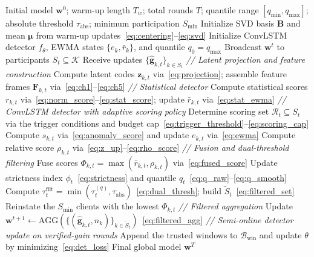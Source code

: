 \documentclass[journal]{IEEEtran}
\begin{document}
\begin{algorithm}[t]
\caption{USTAD-FL: Unsupervised Statistical Anomaly Detection at the server}
\label{alg:ustad}
\begin{algorithmic}[1]
\REQUIRE Initial model $\mathbf{w}^{0}$; warm-up length $T_w$; total rounds $T$; quantile range $[q_{\min},q_{\max}]$; absolute threshold $\tau_{\mathrm{abs}}$; minimum participation $S_{\min}$
\STATE Initialize SVD basis $\mathbf{B}$ and mean $\boldsymbol{\mu}$ from warm-up updates~\eqref{eq:centering}--\eqref{eq:svd}
\STATE Initialize ConvLSTM detector $f_\theta$, EWMA states $\{e_{k},\bar r_{k}\}$, and quantile $q_{0}\!=\!q_{\max}$
    \STATE Broadcast $\mathbf{w}^{t}$ to participants $S_t \subseteq \mathcal{K}$
    \STATE Receive updates $\{\hat{\mathbf{g}}_{k,t}\}_{k\in S_t}$
    \STATE \textit{// Latent projection and feature construction}
    \STATE Compute latent codes $\mathbf{z}_{k,t}$ via~\eqref{eq:projection}; assemble feature frames $\mathbf{F}_{k,t}$ via~\eqref{eq:ch1}--\eqref{eq:ch5}
    \STATE \textit{// Statistical detector}
    \STATE Compute statistical scores $r_{k,t}$ via~\eqref{eq:norm_score}--\eqref{eq:stat_score}; update $\bar r_{k,t}$ via~\eqref{eq:stat_ewma}
    \STATE \textit{// ConvLSTM detector with adaptive scoring policy}
    \STATE Determine scoring set $\mathcal{R}_t \subseteq S_t$ via the trigger conditions and budget cap~\eqref{eq:trigger_threshold}--\eqref{eq:scoring_cap}
        \STATE Compute $s_{k,t}$ via~\eqref{eq:anomaly_score} and update $e_{k,t}$ via~\eqref{eq:ewma}
    \ENDFOR
    \STATE Compute relative score $\rho_{k,t}$ via~\eqref{eq:z_up}--\eqref{eq:rho_score}
    \STATE \textit{// Fusion and dual-threshold filtering}
    \STATE Fuse scores $\Phi_{k,t} \!=\! \max(\bar r_{k,t}, \rho_{k,t})$ via~\eqref{eq:fused_score}
    \STATE Update strictness index $\phi_t$~\eqref{eq:strictness} and quantile $q_t$~\eqref{eq:q_raw}--\eqref{eq:q_smooth}
    \STATE Compute $\tau_t^{\mathrm{filt}} = \min(\tau_t^{(q)}, \tau_{\mathrm{abs}})$~\eqref{eq:dual_thresh}; build $\widetilde{S}_t$~\eqref{eq:filtered_set}
        \STATE Reinstate the $S_{\min}$ clients with the lowest $\Phi_{k,t}$
    \ENDIF
    \STATE \textit{// Filtered aggregation}
    \STATE Update $\mathbf{w}^{t+1} \!\leftarrow\! \text{AGG}(\{(\hat{\mathbf{g}}_{k,t},n_k)\}_{k\in\widetilde{S}_t})$~\eqref{eq:filtered_agg}
    \STATE \textit{// Semi-online detector update on verified-gain rounds}
        \STATE Append the trusted windows to $\mathcal{B}_{\mathrm{win}}$ and update $\theta$ by minimizing~\eqref{eq:det_loss}
    \ENDIF
\ENDFOR
\RETURN Final global model $\mathbf{w}^{T}$
\end{algorithmic}
\end{algorithm}
\end{document}

